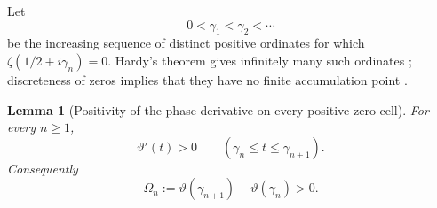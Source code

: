 \documentclass[11pt]{amsart}
\numberwithin{equation}{section}
\newtheorem{lemma}[theorem]{Lemma}
\begin{document}
Let
\begin{equation}
 0<\gamma_1<\gamma_2<\cdots
 \label{eq:critical-zero-ordinates}
\end{equation}
be the increasing sequence of distinct positive ordinates for which
$\zeta(1/2+i\gamma_n)=0$.  Hardy's theorem gives infinitely many such
ordinates \cite{Hardy1914}; discreteness of zeros implies that they have no finite
accumulation point \cite{Titchmarsh1986}.

\begin{lemma}[Positivity of the phase derivative on every positive zero cell]
\label{lem:theta-positive}
For every $n\geq1$,
\begin{equation}
 \vartheta'(t)>0
 \qquad
 (\gamma_n\leq t\leq\gamma_{n+1}).
 \label{eq:theta-positive}
\end{equation}
Consequently
\begin{equation}
 \Omega_n:=\vartheta(\gamma_{n+1})-\vartheta(\gamma_n)>0.
 \label{eq:omega-positive}
\end{equation}
\end{lemma}
\end{document}
